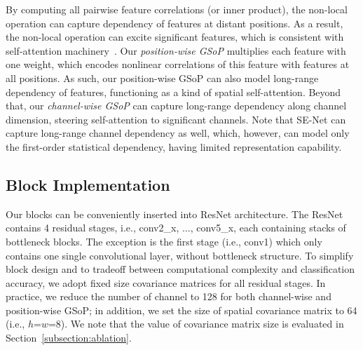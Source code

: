 \documentclass[10pt,twocolumn,letterpaper]{article}
\begin{document}
By computing all pairwise feature  correlations (or inner product), the non-local operation can capture  dependency of features  at distant positions. As a result, the non-local operation can excite significant  features, which is consistent with self-attention  machinery~\cite{NIPS2017_7181}. Our \textit{position-wise GSoP} multiplies each feature  with one weight, which encodes nonlinear correlations of this feature with features at all positions. As such, our position-wise GSoP can also model long-range dependency of  features, functioning as a kind of spatial self-attention. Beyond that, our \textit{channel-wise GSoP} can capture long-range dependency along  channel dimension, steering self-attention to significant  channels. Note that SE-Net can capture long-range channel dependency  as well, which, however, can model only the  first-order statistical dependency, having limited representation capability. 


\subsection{Block Implementation}\label{subsection:block-implementation}

Our blocks can be conveniently  inserted into ResNet architecture. The ResNet contains 4 residual stages, i.e., conv2\_x, $\ldots$, conv5\_x, each containing stacks of bottleneck blocks. The exception is the first stage (i.e., conv1) which only contains  one single convolutional layer, without  bottleneck structure. To simplify block design and to tradeoff between computational complexity and classification accuracy,  we adopt fixed size covariance matrices for  all residual stages. In practice, we reduce the number of channel to 128 for both channel-wise and position-wise GSoP; in addition, we set the size of spatial covariance matrix to 64 (i.e., $h$=$w$=8). We note that the value of covariance matrix size is evaluated in Section~\ref{subsection:ablation}. 
\end{document}
